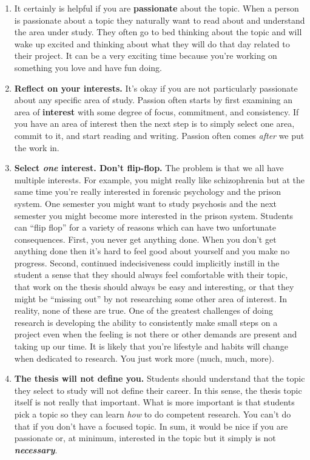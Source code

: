 \documentclass[openany]{book}
\begin{document}
\begin{enumerate}
\def\labelenumi{\arabic{enumi}.}
\item
  It certainly is helpful if you are \textbf{passionate} about the topic. When a person is passionate about a topic they naturally want to read about and understand the area under study. They often go to bed thinking about the topic and will wake up excited and thinking about what they will do that day related to their project. It can be a very exciting time because you're working on something you love and have fun doing.
\item
  \textbf{Reflect on your interests.} It's okay if you are not particularly passionate about any specific area of study. Passion often starts by first examining an area of \textbf{interest} with some degree of focus, commitment, and consistency. If you have an area of interest then the next step is to simply select one area, commit to it, and start reading and writing. Passion often comes \emph{after} we put the work in.
\item
  \textbf{Select \emph{one} interest. Don't flip-flop.} The problem is that we all have multiple interests. For example, you might really like schizophrenia but at the same time you're really interested in forensic psychology and the prison system. One semester you might want to study psychosis and the next semester you might become more interested in the prison system. Students can ``flip flop'' for a variety of reasons which can have two unfortunate consequences. First, you never get anything done. When you don't get anything done then it's hard to feel good about yourself and you make no progress. Second, continued indecisiveness could implicitly instill in the student a sense that they should always feel comfortable with their topic, that work on the thesis should always be easy and interesting, or that they might be ``missing out'' by not researching some other area of interest. In reality, none of these are true. One of the greatest challenges of doing research is developing the ability to consistently make small steps on a project even when the feeling is not there or other demands are present and taking up our time. It is likely that you're lifestyle and habits will change when dedicated to research. You just work more (much, much, more).
\item
  \textbf{The thesis will not define you.} Students should understand that the topic they select to study will not define their career. In this sense, the thesis topic itself is not really that important. What is more important is that students pick a topic so they can learn \emph{how} to do competent research. You can't do that if you don't have a focused topic. In sum, it would be nice if you are passionate or, at minimum, interested in the topic but it simply is not \textbf{\emph{necessary}}.

\end{enumerate}
\end{document}
